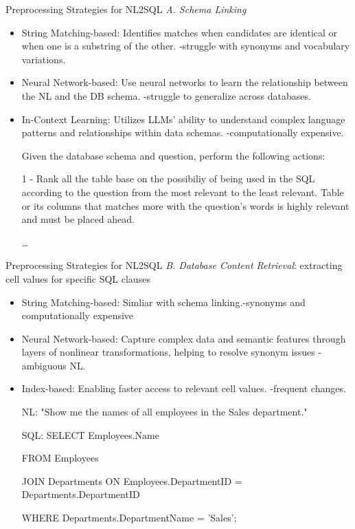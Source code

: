 \documentclass[aspectratio=169,xcolor=dvipsnames]{beamer}
\begin{document}
\begin{frame}{Preprocessing Strategies for NL2SQL}
    \textit{A. Schema Linking}
    \begin{itemize}
        \item String Matching-based: Identifies matches when candidates are identical or when one is a substring of the other. -\alert{struggle with synonyms and vocabulary variations}.
        \item Neural Network-based: Use neural networks to learn the relationship between the NL and the DB schema. -\alert{struggle to generalize across databases}.
        \item In-Context Learning: Utilizes LLMs’ ability to understand complex language patterns and relationships within data schemas. -\alert{computationally expensive}.
        \begin{example}
            Given the database schema and question, perform the following actions:

            1 - Rank all the table base on the possibiliy of being used in the SQL according to the question from the most relevant to the least relevant. Table or its columns that matches more with the question's words is highly relevant and must be placed ahead.

            \dots
        \end{example}
    \end{itemize}
\end{frame}

\begin{frame}{Preprocessing Strategies for NL2SQL}
    \textit{B. Database Content Retrieval}: extracting cell values for specific SQL clauses
    \begin{itemize}
        \item String Matching-based: Simliar with schema linking.-\alert{synonyms and computationally expensive}
        \item Neural Network-based: Capture complex data and semantic features through layers of nonlinear transformations, helping to resolve synonym issues -\alert{ambiguous NL}.
        \item Index-based: Enabling faster access to relevant cell values. -\alert{frequent changes}.
        \begin{example}
            NL: "Show me the names of all employees in the \alert{Sales} department."

            SQL: SELECT Employees.Name  

            FROM Employees  

            JOIN Departments ON Employees.DepartmentID = Departments.DepartmentID  

            WHERE Departments.DepartmentName = '\alert{Sales}';
        \end{example}
    \end{itemize}
\end{frame}
\end{document}
